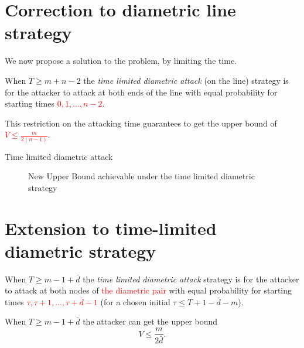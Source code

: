 \documentclass[11pt]{beamer}
\begin{document}
\section[]{Correction to diametric line strategy}
\hypertarget{Correction to line graph strategy}{}
\begin{frame}{\insertsection}
We now propose a solution to the problem, by limiting the time.

\begin{definition}
When $T \geq m+n-2$ the \textit{time limited diametric attack} (on the line) strategy is for the attacker to attack at both ends of the line with equal probability for starting times \textcolor{red}{$0,1,...,n-2$}.
\end{definition}

This restriction on the attacking time guarantees to get the upper bound of \textcolor{red}{$V \leq \frac{m}{2(n-1)}$}.
\end{frame}

\begin{frame}{Time limited diametric attack}
\begin{figure}
\resizebox{0.95\linewidth}{!}{
}
\caption{New Upper Bound achievable under the time limited diametric strategy}
\end{figure}
\end{frame}

\section[]{Extension to time-limited diametric strategy}
\hypertarget{Extension of correction strategy}{}
\begin{frame}{\insertsection}

\begin{definition}
When $T \geq m-1+\bar{d}$ the \textit{time limited diametric attack} strategy is for the attacker to attack at both nodes of \textcolor{red}{the diametric pair} with equal probability for starting times \textcolor{red}{$\tau,\tau +1,...,\tau + \bar{d}-1$} (for a chosen initial $\tau \leq T+1-\bar{d}-m$).
\end{definition}

\begin{lemma}
When $T \geq m-1 +\bar{d}$ the attacker can get the upper bound
$$V \leq \dfrac{m}{2\bar{d}}.$$
\end{lemma}

\end{frame}
\end{document}
